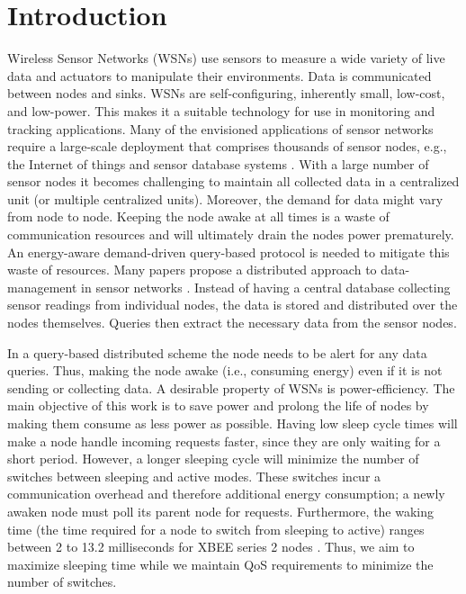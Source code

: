 \section{Introduction}\label{sec:Intro}

Wireless Sensor Networks (WSNs) use sensors to measure a wide variety of live data and actuators to manipulate their environments. Data is communicated between nodes and sinks. WSNs are self-configuring, inherently small, low-cost, and low-power. This makes it a suitable technology for use in monitoring and tracking applications. Many of the envisioned applications of sensor networks require a large-scale deployment that comprises thousands of sensor nodes, e.g., the Internet of things \cite{22} and sensor database systems \cite{2}. With a large number of sensor nodes it becomes challenging to maintain all collected data in a centralized unit (or multiple centralized units). Moreover, the demand for data might vary from node to node. Keeping the node awake at all times is a waste of communication resources and will ultimately drain the nodes power prematurely. An energy-aware demand-driven query-based protocol is needed to mitigate this waste of resources. Many papers propose a distributed approach to data-management in sensor networks \cite{2,4.11,23}. Instead of having a central database collecting sensor readings from individual nodes, the data is stored and distributed over the nodes themselves. Queries then extract the necessary data from the sensor nodes. 

In a query-based distributed scheme the node needs to be alert for any data queries. Thus, making the node awake (i.e., consuming energy) even if it is not sending or collecting data. A desirable property of WSNs is power-efficiency. The main objective of this work is to save power and prolong the life of nodes by making them consume as less power as possible. Having low sleep cycle times will make a node handle incoming requests faster, since they are only waiting for a short period. However, a longer sleeping cycle will minimize the number of switches between sleeping and active modes. These switches incur a communication overhead and therefore additional energy consumption; a newly awaken node must poll its parent node for requests. Furthermore, the waking time (the time required for a node to switch from sleeping to active) ranges between 2 to 13.2 milliseconds for XBEE series 2 nodes \cite{19}. Thus, we aim to maximize sleeping time while we maintain QoS requirements to minimize the number of switches.

